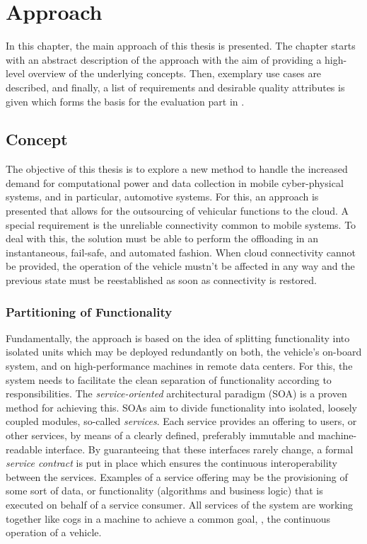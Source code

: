 
\chapter{Approach}\label{chapter:approach}

In this chapter, the main approach of this thesis is presented. The chapter starts with an abstract description of the approach with the aim of providing a high-level overview of the underlying concepts. Then, exemplary use cases are described, and finally, a list of requirements and desirable quality attributes is given which forms the basis for the evaluation part in .

%
%
%
%
%
%
%
%
%
%

\section{Concept} \label{sec:concept}
The objective of this thesis is to explore a new method to handle the increased demand for computational power and data collection in mobile cyber-physical systems, and in particular, automotive systems. For this, an approach is presented that allows for the outsourcing of vehicular functions to the cloud.
A special requirement is the unreliable connectivity common to mobile systems. To deal with this, the solution must be able to perform the offloading in an instantaneous, fail-safe, and automated fashion. When cloud connectivity cannot be provided, the operation of the vehicle mustn't be affected in any way and the previous state must be reestablished as soon as connectivity is restored.

\subsection{Partitioning of Functionality}
Fundamentally, the approach is based on the idea of splitting functionality into isolated units which may be deployed redundantly on both, the vehicle's on-board system, and on high-performance machines in remote data centers. For this, the system needs to facilitate the clean separation of functionality according to responsibilities. The \emph{service-oriented} architectural paradigm (SOA) \cite{erl2008soa} is a proven method for achieving this. SOAs aim to divide functionality into isolated, loosely coupled modules, so-called \emph{services}. Each service provides an offering to users, or other services, by means of a clearly defined, preferably immutable and machine-readable interface. By guaranteeing that these interfaces rarely change, a formal \emph{service contract} is put in place which ensures the continuous interoperability between the services. Examples of a service offering may be the provisioning of some sort of data, or functionality (algorithms and business logic) that is executed on behalf of a service consumer. All services of the system are working together like cogs in a machine to achieve a common goal, \ie , the continuous operation of a vehicle.


